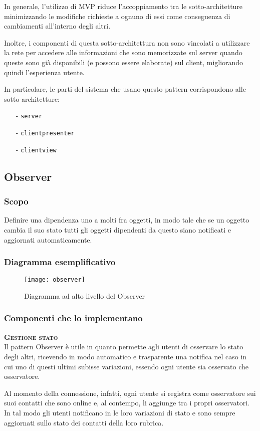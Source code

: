 In generale, l'utilizzo di MVP riduce l'accoppiamento tra le sotto-architetture minimizzando le modifiche richieste a ognuno di essi come conseguenza di cambiamenti all'interno degli altri.

Inoltre, i componenti di questa sotto-architettura non sono vincolati a utilizzare la rete per accedere alle informazioni che sono memorizzate sul server quando queste sono già disponibili (e possono essere elaborate) sul client, migliorando quindi l'esperienza utente.

In particolare, le parti del sistema che usano questo pattern corrispondono alle sotto-architetture:
\begin{itemize}[noitemsep,nolistsep]
  \item[-] \texttt{server}
  \item[-] \texttt{clientpresenter}
  \item[-] \texttt{clientview}
\end{itemize}

\subsection{Observer}

\subsubsection{Scopo}
Definire una dipendenza uno a molti fra oggetti, in modo tale che se un oggetto cambia il suo stato tutti gli oggetti dipendenti da questo siano notificati e aggiornati automaticamente.

\subsubsection{Diagramma esemplificativo}
\begin{figure}[H]
\centering
\texttt{[image: observer]}
\caption{Diagramma ad alto livello del  Observer}\label{fig:observer}
\end{figure}

\subsubsection{Componenti che lo implementano}
\begin{description}
  \item{\scshape\bfseries Gestione stato}\\
Il pattern Observer è utile in quanto permette agli utenti di osservare lo stato degli altri, ricevendo in modo automatico e trasparente una notifica nel caso in cui uno di questi ultimi subisse variazioni, essendo ogni utente sia osservato che osservatore.

Al momento della connessione, infatti, ogni utente si registra come osservatore sui suoi contatti che sono online e, al contempo, li aggiunge tra i propri osservatori. In tal modo gli utenti notificano in  le loro variazioni di stato e sono sempre aggiornati sullo stato dei contatti della loro rubrica.
\end{description}

